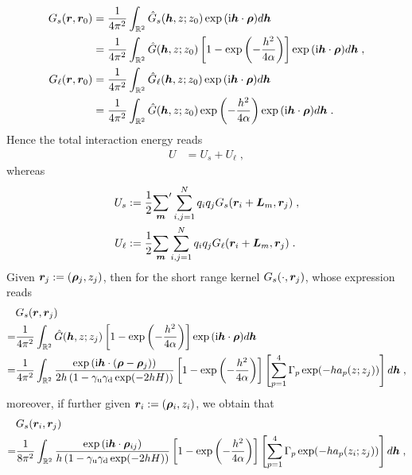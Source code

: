 \begin{equation*}
\begin{aligned}
 G_s(\boldsymbol{r}, \boldsymbol{r}_0)&=   \frac{1}{4\pi^2}\int_{\mathbb{R}^2} \hat{G}_s(\boldsymbol{h}, z; z_0)\exp{(\mathrm{i} \boldsymbol{h} \cdot \boldsymbol{\rho})} d \boldsymbol{h}\\
 &= \frac{1}{4\pi^2}\int_{\mathbb{R}^2} \hat{G}(\boldsymbol{h}, z; z_0)\left[1-\exp\left(-\frac{h^2}{4\alpha}\right)\right]\exp{(\mathrm{i} \boldsymbol{h} \cdot \boldsymbol{\rho})} d \boldsymbol{h}\;,\\
  G_\ell(\boldsymbol{r}, \boldsymbol{r}_0)&=   \frac{1}{4\pi^2}\int_{\mathbb{R}^2} \hat{G}_\ell(\boldsymbol{h}, z; z_0)\exp{(\mathrm{i} \boldsymbol{h} \cdot \boldsymbol{\rho})} d \boldsymbol{h}\\
 &= \frac{1}{4\pi^2}\int_{\mathbb{R}^2} \hat{G}(\boldsymbol{h}, z; z_0)\exp\left(-\frac{h^2}{4\alpha}\right)\exp{(\mathrm{i} \boldsymbol{h} \cdot \boldsymbol{\rho})} d \boldsymbol{h}\;.
\end{aligned}    
\end{equation*}
Hence the total interaction energy reads
\begin{align*}
   U & =   U_s+U_\ell\;,
\end{align*}
whereas
\begin{align}
U_s&:=    \frac{1}{2} {\sum_{\boldsymbol{m}}}^\prime \sum_{i, j = 1}^{N} q_i q_j G_s(\boldsymbol{r}_i+\bm{L}_m, \boldsymbol{r}_j)\;, \label{eq::U_s}\\
U_\ell&:=   \frac{1}{2} {\sum_{\boldsymbol{m}}}\sum_{i, j = 1}^{N} q_i q_j  G_\ell(\boldsymbol{r}_i+\bm{L}_m, \boldsymbol{r}_j)\;. \label{eq::U_l}
\end{align}
Given $\bm{r}_j:=(\bm{\rho}_j, z_j)$, then for the short range kernel $G_s(\cdot, \boldsymbol{r}_j)$, whose expression reads 
\begin{align*}
 &G_s(\boldsymbol{r}, \boldsymbol{r}_j)\\
 =&   \frac{1}{4\pi^2}\int_{\mathbb{R}^2} \hat{G}(\boldsymbol{h}, z; z_j)\left[1-\exp\left(-\frac{h^2}{4\alpha}\right)\right]\exp{(\mathrm{i} \boldsymbol{h} \cdot \boldsymbol{\rho})} d \boldsymbol{h}\\
 =& \frac{1}{4\pi^2}\int_{\mathbb{R}^2} \frac{ \exp{(\mathrm{i} \boldsymbol{h} \cdot (\boldsymbol{\rho}-\boldsymbol{\rho}_j))}}{2h \left(1-\gamma_{\mathrm{u}}\gamma_{\mathrm{d}}\exp(-2hH)\right)} \left[1-\exp\left(-\frac{h^2}{4\alpha}\right)\right]\left[\sum_{p=1}^4\Gamma_p\exp(-ha_p(z;z_j))\right]d \boldsymbol{h}\;,
\end{align*}
moreover, if further given $\boldsymbol{r}_i:=(\bm{\rho}_i, z_i)$, we obtain that 
\begin{align*}
   &G_s(\boldsymbol{r}_i, \boldsymbol{r}_j)\\
   =& \frac{1}{8\pi^2 }\int_{\mathbb{R}^2} \frac{ \exp{(\mathrm{i} \boldsymbol{h} \cdot \boldsymbol{\rho}_{ij})}}{h\left(1-\gamma_{\mathrm{u}}\gamma_{\mathrm{d}}\exp(-2hH)\right)} \left[1-\exp\left(-\frac{h^2}{4\alpha}\right)\right]\left[\sum_{p=1}^4\Gamma_p\exp(-ha_p(z_i;z_j))\right]d \boldsymbol{h}\;,
\end{align*}
